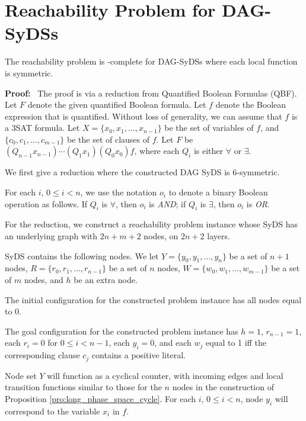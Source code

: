 \section{Reachability Problem for DAG-SyDSs}
\label{sec:reachability}

\begin{theorem}\label{thm:reachability-PSPACE}
The reachability problem is \cpsp-complete for DAG-SyDSs
where each local function is symmetric.
\end{theorem}

\noindent
\textbf{Proof:}~ 
The proof is via a reduction from Quantified Boolean Formulas (QBF).
Let $F$ denote the given quantified Boolean formula.
Let $f$ denote the Boolean expression that is quantified.
Without loss of generality, we can assume that $f$ is a 3SAT formula.
Let $X = \{x_0, x_1, \dots , x_{n-1}\}$ be the set of variables of $f$,
and $\{c_0, c_1, \dots , c_{m-1}\}$ be the set of clauses of $f$.
Let $F$ be $(Q_ {n-1} x_{n-1}) \cdots (Q_1 x_1) (Q_0 x_0) f$,
where each $Q_i$ is either $\forall$ or $\exists$.       

We first give a reduction where the constructed DAG SyDS is 6-symmetric.

For each $i$, $0 \leq i <n$,
 we use the notation $o_i$ to denote a binary Boolean operation as follows.
 If $Q_i$ is $\forall$, then $o_i$ is {\em AND};
 if $Q_i$ is $\exists$, then $o_i$ is {\em OR}.

For the reduction, we construct a reachability problem instance whose SyDS \cals{} 
has an underlying graph with $2n+m+2$ nodes, on $2n+2$ layers. 

SyDS \cals{} contains the following nodes.
We let $Y = \{y_0, y_1, \dots , y_n\}$ be a set of $n+1$ nodes,
$R = \{r_0, r_1, \dots , r_{n-1}\}$ be a set of $n$ nodes,
$W = \{w_0, w_1, \dots , w_{m-1}\}$ be a set of $m$ nodes,
 and $h$ be an extra node.
 
The initial configuration \calc{} for the constructed problem instance
 has all nodes equal to 0.

The goal configuration \cald{} for the constructed problem instance 
has $h =1$, $r_{n-1} = 1$,  each  $r_i= 0$ for $0 \leq i  < n-1$, 
each  $y_i= 0$, 
and each $w_j$ equal to 1 iff the corresponding clause $c_j$ contains a positive literal.

Node set $Y$ will function as a cyclical counter,
with incoming edges and local transition functions similar to those for
the $n$ nodes in the construction of Proposition \ref{pro:long_phase_space_cycle}.
For each $i$, $0 \leq i < n$,
node $y_i$ will correspond to the variable $x_i$ in $f$.

